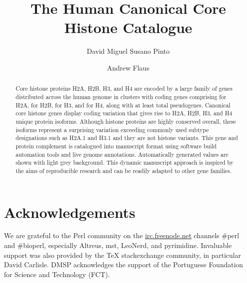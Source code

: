 \documentclass[9pt,lineno]{elife}
\title{The Human Canonical Core Histone Catalogue}
\author[1,\authfn{1}]{David Miguel Susano Pinto}
\author[1]{Andrew Flaus}
\affil[1]{Centre for Chromosome Biology, School of Natural Sciences,
  National University of Ireland Galway, Galway, Ireland}
\begin{document}
  \maketitle

  \begin{abstract}
    Core histone proteins H2A, H2B, H3, and H4 are encoded
    by a large family of genes distributed across the human genome
    in \TotalCoreCodingGenes{} clusters
    with \TotalCoreCodingGenes{} coding genes comprising
    \HTwoACodingGenes{} for H2A,
    \HTwoBCodingGenes{} for H2B,
    \HThreeCodingGenes{} for H3,
    and \HFourCodingGenes{} for H4,
    along with at least \TotalCorePseudoGenes{} total pseudogenes.
    Canonical core histone genes display coding variation that gives rise to
    \HTwoAUniqueProteins{} H2A, \HTwoBUniqueProteins{} H2B,
    \HThreeUniqueProteins{} H3, and \HFourUniqueProteins{} H4
    unique protein isoforms.
    Although histone proteins are highly conserved overall,
    these isoforms represent a surprising variation
    exceeding commonly used subtype designations
    such as H2A.1 and H3.1 and they are not histone variants.
    This gene and protein complement is catalogued into manuscript format
    using software build automation tools and live genome annotations.
    Automatically generated values are shown with light grey background.
    This dynamic manuscript approach is inspired
    by the aims of reproducible research
    and can be readily adapted to other gene families.
  \end{abstract}

  
  
  
  
  
  
  

  \section{Acknowledgements}
    We are grateful to the Perl community on the \url{irc.freenode.net}
    channels \#perl and \#bioperl,
    especially Altreus, mst, LeoNerd, and pyrimidine.
    Invaluable support was also provided by the \TeX{} stackexchange community,
    in particular David Carlisle.
    DMSP acknowledges the support of the Portuguese Foundation for
    Science and Technology (FCT).

  

  \appendix
  
\end{document}
